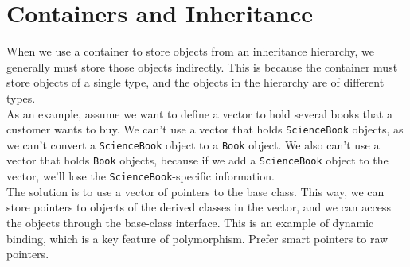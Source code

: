 \section{Containers and Inheritance}

When we use a container to store objects from an inheritance hierarchy, we generally must store
those objects indirectly. This is because the container must store objects of a single type, and
the objects in the hierarchy are of different types.\\

As an example, assume we want to define a vector to hold several books that a customer wants to buy.
We can't use a vector that holds \texttt{ScienceBook} objects, as we can't convert a \texttt{ScienceBook}
object to a \texttt{Book} object. We also can't use a vector that holds \texttt{Book} objects, because
if we add a \texttt{ScienceBook} object to the vector, we'll lose the \texttt{ScienceBook}-specific
information.\\

The solution is to use a vector of pointers to the base class. This way, we can store pointers to
objects of the derived classes in the vector, and we can access the objects through the base-class
interface. This is an example of dynamic binding, which is a key feature of polymorphism. Prefer
smart pointers to raw pointers.\\